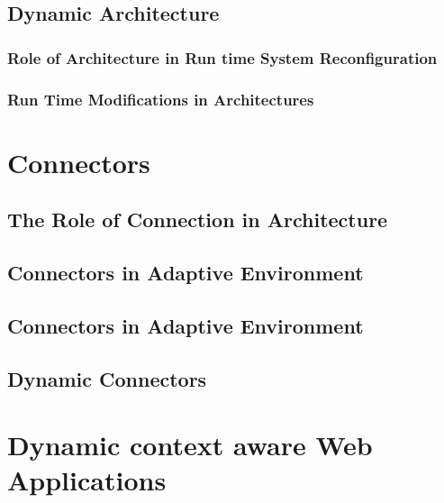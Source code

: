 \subsection{Dynamic Architecture}
\subsubsection {Role of Architecture in Run time System Reconfiguration}
\subsubsection{Run Time Modifications in Architectures}


\section{Connectors}
\subsection{The Role of Connection in Architecture}
\subsection{Connectors in Adaptive Environment}
\subsection{Connectors in Adaptive Environment}
\subsection{Dynamic Connectors}

\section{Dynamic context aware Web Applications}

